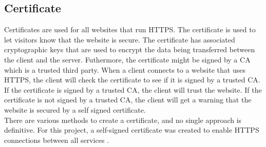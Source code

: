 \subsection{Certificate}
\label{sec:certificate}
Certificates are used for all websites that run \ac{HTTPS}. 
The certificate is used  to let visitors know that the website is secure.
The certificate has associated cryptographic keys that are used to encrypt the data being transferred between the client and the server.
Futhermore, the certificate might be signed by a \ac{CA} which is a trusted third party.
When a client connects to a website that uses \ac{HTTPS}, the client will check the certificate
to see if it is signed by a trusted \ac{CA}. If the certificate is signed by a trusted \ac{CA}, the client
will trust the website. If the certificate is not signed by a trusted \ac{CA}, the client will get a warning
that the website is secured by a self signed certificate.\\
There are various methods to create a certificate, and no single approach is definitive. 
For this project, a self-signed certificate was created to enable HTTPS connections between all services \cite{self-signed-cert}.


